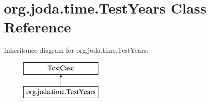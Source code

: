 \hypertarget{classorg_1_1joda_1_1time_1_1_test_years}{\section{org.\-joda.\-time.\-Test\-Years Class Reference}
\label{classorg_1_1joda_1_1time_1_1_test_years}
}
Inheritance diagram for org.\-joda.\-time.\-Test\-Years\-:\begin{figure}[H]
\begin{center}
\leavevmode
\includegraphics[height=2.000000cm]{classorg_1_1joda_1_1time_1_1_test_years}
\end{center}
\end{figure}
